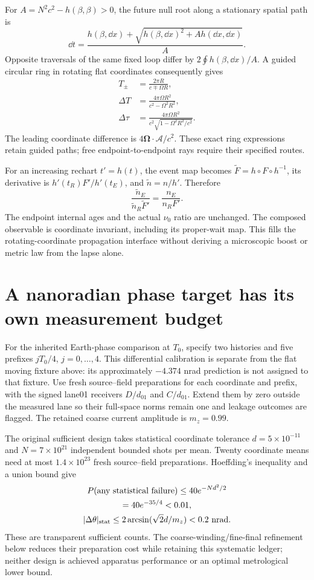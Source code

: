 For $A=N^2c^2-h(\beta,\beta)>0$, the future null root along a stationary spatial path is
\[
 \dd t=\frac{h(\beta,\dd x)+
 \sqrt{h(\beta,\dd x)^2+A h(\dd x,\dd x)}}A.
\]
Opposite traversals of the same fixed loop differ by $2\oint h(\beta,\dd x)/A$. A guided circular ring in rotating flat coordinates consequently gives
\[
 \begin{aligned}
 T_\pm&=\frac{2\pi R}{c\mp\Omega R},\\
 \Delta T&=\frac{4\pi\Omega R^2}{c^2-\Omega^2R^2},\\
 \Delta\tau&=\frac{4\pi\Omega R^2}{c^2\sqrt{1-\Omega^2R^2/c^2}}.
 \end{aligned}
\]
The leading coordinate difference is $4\bm\Omega\cdot\bm{\mathcal A}/c^2$. These exact ring expressions retain guided paths; free endpoint-to-endpoint rays require their specified routes.

For an increasing rechart $t'=h(t)$, the event map becomes $\widetilde F=h\circ F\circ h^{-1}$, its derivative is $h'(t_R)F'/h'(t_E)$, and $\widetilde n=n/h'$. Therefore
\[
 \frac{\widetilde n_E}{\widetilde n_R\widetilde F'}
 =\frac{n_E}{n_RF'}.
\]
The endpoint internal ages and the actual $\nu_0$ ratio are unchanged. The composed observable is coordinate invariant, including its proper-wait map. This fills the rotating-coordinate propagation interface without deriving a microscopic boost or metric law from the lapse alone.

\section{A nanoradian phase target has its own measurement budget}\label{sec:nanoradian-budget}
For the inherited Earth-phase comparison at $T_0$, specify two histories and five prefixes $jT_0/4$, $j=0,\ldots,4$. This differential calibration is separate from the flat moving fixture above: its approximately $-4.374$ nrad prediction is not assigned to that fixture. Use fresh source--field preparations for each coordinate and prefix, with the signed lane01 receivers $D/d_{01}$ and $C/d_{01}$. Extend them by zero outside the measured lane so their full-space norms remain one and leakage outcomes are flagged. The retained coarse current amplitude is $m_z=0.99$.

The original sufficient design takes statistical coordinate tolerance $d=5\times10^{-11}$ and $N=7\times10^{21}$ independent bounded shots per mean. Twenty coordinate means need at most $1.4\times10^{23}$ fresh source--field preparations. Hoeffding's inequality and a union bound give
\[
 \begin{gathered}
 P(\hbox{any statistical failure})\le40e^{-Nd^2/2}\\
              =40e^{-35/4}<0.01,\\
 |\Delta\theta|_{\rm stat}\le2\arcsin(\sqrt2d/m_z)<0.2\ {\rm nrad}.
 \end{gathered}
\]
These are transparent sufficient counts. The coarse-winding/fine-final refinement below reduces their preparation cost while retaining this systematic ledger; neither design is achieved apparatus performance or an optimal metrological lower bound.

